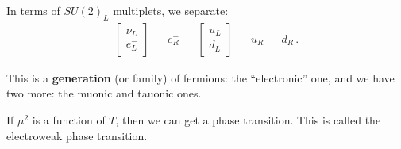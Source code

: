 \documentclass[main.tex]{subfiles}
\begin{document}


In terms of \(SU(2)_L\) multiplets, we separate: 
%
\begin{align}
\left[\begin{array}{c}
\nu_{L} \\ 
e^{-}_{L}
\end{array}\right]
&&
e^{-}_{R}
&& 
\left[\begin{array}{c}
u_L \\ 
d_L
\end{array}\right]
&&
u_R
&&
d_R
\,.
\end{align}

This is a \textbf{generation} (or family) of fermions: the ``electronic'' one, and we have two more: the muonic and tauonic ones.

If \(\mu^2\) is a function of \(T\), then we can get a phase transition.
This is called the electroweak phase transition.
\end{document}
